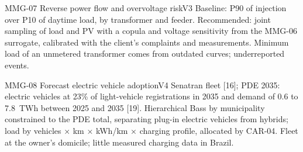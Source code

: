 \begin{ficha}{MMG-07 \textperiodcentered{} Reverse power flow and overvoltage risk}{V3}
 Baseline: P90 of injection over P10 of daytime load,
by transformer and feeder. Recommended: joint sampling of load and
PV with a copula and voltage sensitivity from the MMG-06 surrogate, calibrated
with the client's complaints and measurements.
 Minimum load of an unmetered transformer comes from outdated
curves; underreported events.
\end{ficha}

\begin{ficha}{MMG-08 \textperiodcentered{} Forecast electric vehicle adoption}{V4}
 Senatran fleet [16]; PDE 2035: electric vehicles at 23\% of
light-vehicle registrations in 2035 and demand of 0.6 to 7.8~TWh between 2025 and 2035
[19].
 Hierarchical Bass by municipality constrained to the PDE total,
separating plug-in electric vehicles from hybrids; load by vehicles × km × kWh/km ×
charging profile, allocated by CAR-04.
 Fleet at the owner's domicile; little measured charging
data in Brazil.
\end{ficha}

